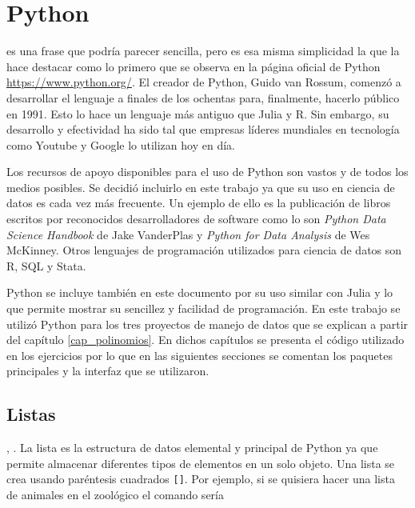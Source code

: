 \chapter{Python} \label{cap_python}

 es una frase que podría parecer sencilla, pero es esa misma simplicidad la que la hace destacar como lo primero que se observa en la página oficial de \textsf{Python} \url{https://www.python.org/}. El creador de \textsf{Python}, Guido van Rossum, comenzó a desarrollar el lenguaje a finales de los ochentas para, finalmente, hacerlo público en 1991. Esto lo hace un lenguaje más antiguo que \textsf{Julia} y \textsf{R}. Sin embargo, su desarrollo y efectividad ha sido tal que empresas líderes mundiales en tecnología como Youtube y Google lo utilizan hoy en día. 

Los recursos de apoyo disponibles para el uso de \textsf{Python} son vastos y de todos los medios posibles. Se decidió incluirlo en este trabajo ya que su uso en ciencia de datos es cada vez más frecuente. Un ejemplo de ello es la publicación de libros escritos por reconocidos desarrolladores de software como lo son \textit{Python Data Science Handbook} de Jake VanderPlas y \textit{Python for Data Analysis} de Wes McKinney. Otros lenguajes de programación utilizados para ciencia de datos son \textsf{R, SQL} y \textsf{Stata}. 

\textsf{Python} se incluye también en este documento por su uso similar con \textsf{Julia} y  lo que permite mostrar su sencillez y facilidad de programación. En este trabajo se utilizó \textsf{Python} para los tres proyectos de manejo de datos que se explican a partir del capítulo \ref{cap_polinomios}. En dichos capítulos se presenta el código utilizado en los ejercicios por lo que en las siguientes secciones se comentan los paquetes principales y la interfaz que se utilizaron. 

\section{Listas}
, \cite{matthes2019python}. La lista es la estructura de datos elemental y principal de \textsf{Python} ya que permite almacenar diferentes tipos de elementos en un solo objeto. Una lista se crea usando paréntesis cuadrados \texttt{[]}. Por ejemplo, si se quisiera hacer una lista de animales en el zoológico el comando sería 

